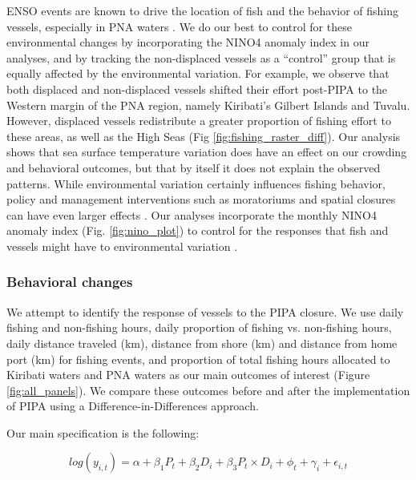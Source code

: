 \documentclass[12pt]{article}
\begin{document}
ENSO events are known to drive the location of fish and the behavior of fishing vessels, especially in PNA waters \cite{lehodey_1997,kroodsma_2018,aqorau_2018}. We do our best to control for these environmental changes by incorporating the NINO4 anomaly index in our analyses, and by tracking the non-displaced vessels as a ``control'' group that is equally affected by the environmental variation. For example, we observe that both displaced and non-displaced vessels shifted their effort post-PIPA to the Western margin of the PNA region, namely Kiribati's Gilbert Islands and Tuvalu. However, displaced vessels redistribute a greater proportion of fishing effort to these areas, as well as the High Seas (Fig \ref{fig:fishing_raster_diff}). Our analysis shows that sea surface temperature variation does have an effect on our crowding and behavioral outcomes, but that by itself it does not explain the observed patterns. While environmental variation certainly influences fishing behavior, policy and management interventions such as moratoriums and spatial closures can have even larger effects \cite{kroodsma_2018}.  Our analyses incorporate the monthly NINO4 anomaly index (Fig. \ref{fig:nino_plot}) to control for the responses that fish and vessels might have to environmental variation \cite{lehodey_1997,kroodsma_2018,aqorau_2018}.

\subsubsection{Behavioral changes}

We attempt to identify the response of vessels to the PIPA closure. We use daily fishing and non-fishing hours, daily proportion of fishing vs. non-fishing hours, daily distance traveled (km), distance from shore (km) and distance from home port (km) for fishing events, and proportion of total fishing hours allocated to Kiribati waters and PNA waters as our main outcomes of interest (Figure \ref{fig:all_panels}). We compare these outcomes before and after the implementation of PIPA using a Difference-in-Differences approach.

Our main specification is the following:

$$
log(y_{i,t}) = \alpha + \beta_1 P_t + \beta_2 D_i + \beta_3 P_t \times D_i + \phi_t + \gamma_i + \epsilon_{i,t}
\label{eqn:did}
$$
\end{document}
